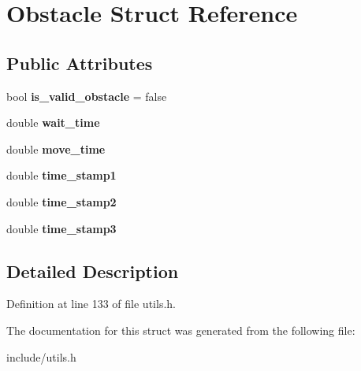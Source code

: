 \hypertarget{structObstacle}{}\section{Obstacle Struct Reference}
\label{structObstacle}
\subsection*{Public Attributes}
\begin{DoxyCompactItemize}
\item 
\mbox{\label{structObstacle_ab88de890a974156c7219888a3dc96637}} 
bool {\bfseries is\+\_\+valid\+\_\+obstacle} = false
\item 
\mbox{\label{structObstacle_a7c2e9d270de02ef39fcff4d3554773df}} 
double {\bfseries wait\+\_\+time}
\item 
\mbox{\label{structObstacle_a77458e806b216dbf25ca631690d22228}} 
double {\bfseries move\+\_\+time}
\item 
\mbox{\label{structObstacle_a5bcfcca2dbd5380bdd91ea5056504c96}} 
double {\bfseries time\+\_\+stamp1}
\item 
\mbox{\label{structObstacle_ad60911198b979bf97ec677f48e19743e}} 
double {\bfseries time\+\_\+stamp2}
\item 
\mbox{\label{structObstacle_aa41c84b622e568408761fa419398d902}} 
double {\bfseries time\+\_\+stamp3}
\end{DoxyCompactItemize}


\subsection{Detailed Description}


Definition at line 133 of file utils.\+h.



The documentation for this struct was generated from the following file\+:\begin{DoxyCompactItemize}
\item 
include/utils.\+h\end{DoxyCompactItemize}

